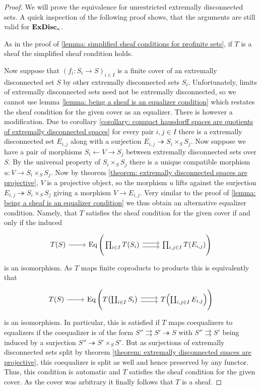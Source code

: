 \begin{proof}
	We will prove the equivalence for unrestricted extremally disconnected sets. A quick inspection of the following proof shows, that the arguments are still valid for ${\mathbf{ExDisc}}_{\kappa}$.
	
	As in the proof of \ref{lemma: simplified sheaf conditions for profinite sets}, if $T$ is a sheaf the simplified sheaf condition holds.
	
	Now suppose that $(f_i\colon S_i\to S)_{i\in I}$ is a finite cover of an extremally disconnected set $S$ by other extremally disconnected sets $S_i$. Unfortunately, limits of extremally disconnected sets need not be extremally disconnected, so we cannot use lemma \ref{lemma: being a sheaf is an equalizer condition} which restates the sheaf condition for the given cover as an equalizer. There is however a modification. Due to corollary \ref{corollary: compact hausdorff spaces are quotients of extremally disconnected spaces} for every pair $i, j\in I$ there is a extremally disconnected set $E_{i,j}$ along with a surjection $E_{i, j} \twoheadrightarrow S_i\times_S S_j$. Now suppose we have a pair of morphisms $S_i\leftarrow V\rightarrow S_j$ between extremally disconnected sets over $S$. By the universal property of $S_i\times_S S_j$ there is a unique compatible morphism $u\colon V\to S_i \times_S S_j$. Now by theorem \ref{theorem: extremally disconnected spaces are projective}, $V$ is a projective object, so the morphism $u$ lifts against the surjection $E_{i, j} \twoheadrightarrow S_i\times_S S_j$ giving a morphism $V\to E_{i, j}$. Very similar to the proof of \ref{lemma: being a sheaf is an equalizer condition} we thus obtain an alternative equalizer condition. Namely, that $T$ satisfies the sheaf condition for the given cover if and only if the induced
	$$\begin{tikzcd}
		T(S) \ar[r] &\equalizer\Bigg(\prod_{i\in I} T(S_i) \ar[r, shift left=1.1] \ar[r, shift right=1.1] &\prod_{i, j \in I} T(E_{i, j})\Bigg)
	\end{tikzcd}$$
	is an isomorphism. As $T$ maps finite coproducts to products this is equivalently that
	$$\begin{tikzcd}
		T(S) \ar[r] &\equalizer\Bigg(T\mleft(\coprod_{i\in I} S_i\mright) \ar[r, shift left=1.1] \ar[r, shift right=1.1] &T\mleft(\coprod_{i, j \in I} E_{i, j}\mright)\Bigg)
	\end{tikzcd}$$
	is an isomorphism. In particular, this is satisfied if $T$ maps coequalizers to equalizers if the coequalizer is of the form $S''\rightrightarrows S' \twoheadrightarrow S$ with $S''\rightrightarrows S'$ being induced by a surjection $S''\twoheadrightarrow S'\times_S S'$. But as surjections of extremally disconnected sets split by theorem \ref{theorem: extremally disconnected spaces are projective}, this coequalizer is split as well and hence preserved by any functor. Thus, this condition is automatic and $T$ satisfies the sheaf condition for the given cover. As the cover was arbitrary it finally follows that $T$ is a sheaf.
\end{proof}

